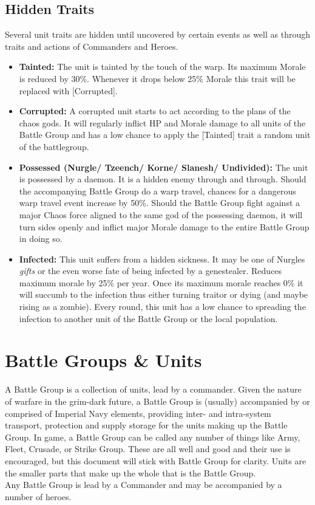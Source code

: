  	\subsection{Hidden Traits}
 	Several unit traits are hidden until uncovered by certain events as well as through traits and actions of Commanders and Heroes.
 	\begin{itemize}
 	\item \textbf{Tainted:} The unit is tainted by the touch of the warp. Its maximum Morale is reduced by 30\%. Whenever it drops below 25\% Morale this trait will be replaced with [Corrupted].
 	\item \textbf{Corrupted:} A corrupted unit starts to act according to the plans of the chaos gods. It will regularly inflict HP and Morale damage to all units of the Battle Group and has a low chance to apply the [Tainted] trait a random unit of the battlegroup.
 	\item \textbf{Possessed (Nurgle/ Tzeench/ Korne/ Slanesh/ Undivided):} The unit is possessed by a daemon. It is a hidden enemy through and through. Should the accompanying Battle Group do a warp travel, chances for a dangerous warp travel event increase by 50\%. Should the Battle Group fight against a major Chaos force aligned to the same god of the possessing daemon, it will turn sides openly and inflict major Morale damage to the entire Battle Group in doing so.
 	\item \textbf{Infected:} This unit suffers from a hidden sickness. It may be one of Nurgles \textit{gifts} or the even worse fate of being infected by a genestealer. Reduces maximum morale by 25\% per year. Once its maximum morale reaches 0\% it will succumb to the infection thus either turning traitor or dying (and maybe rising as a zombie). Every round, this unit has a low chance to spreading the infection to another unit of the Battle Group or the local population.
\end{itemize}

\section{Battle Groups \& Units}
A Battle Group is a collection of units, lead by a commander. Given the nature of warfare in the grim-dark future, a Battle Group is (usually) accompanied by or comprised of Imperial Navy elements, providing inter- and intra-system transport, protection and supply storage for the units making up the Battle Group.  In game, a Battle Group can be called any number of things like Army, Fleet, Crusade, or Strike Group. 
These are all well and good and their use is encouraged, but this document will stick with Battle Group for clarity.
Units are the smaller parts that make up the whole that is the Battle Group. \\
Any Battle Group is lead by a Commander and may be accompanied by a number of heroes.

